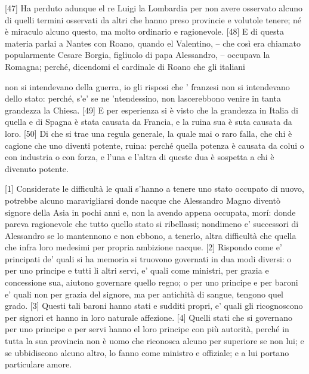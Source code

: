 {[}47{]} Ha perduto adunque el re Luigi la Lombardia per non avere
osservato alcuno di quelli termini osservati da altri che hanno preso
provincie e volutole tenere; né è miraculo alcuno questo, ma molto
ordinario e ragionevole. {[}48{]} E di questa materia parlai a Nantes
con Roano, quando el Valentino, -- che così era chiamato popularmente
Cesare Borgia, figliuolo di papa Alessandro, -- occupava la Romagna;
perché, dicendomi el cardinale di Roano che gli italiani \linebreak

\quebra

\noindent{}non si
intendevano della guerra, io gli risposi che ' franzesi non si
intendevano dello stato: perché, s'e' se ne 'ntendessino, non
lascerebbono venire in tanta grandezza la Chiesa. {[}49{]} E per
esperienza si è visto che la grandezza in Italia di quella e di Spagna è
stata causata da Francia, e la ruina sua è suta causata da loro.
{[}50{]} Di che si trae una regula generale, la quale mai o raro falla,
che chi è cagione che uno diventi potente, ruina: perché quella potenza
è causata da colui o con industria o con forza, e l'una e l'altra di
queste dua è sospetta a chi è divenuto potente.


{[}1{]} Considerate le difficultà le quali s'hanno a tenere uno stato
occupato di nuovo, potrebbe alcuno maravigliarsi donde nacque che
Alessandro Magno diventò signore della Asia in pochi anni e, non la
avendo appena occupata, morí: donde pareva ragionevole che tutto quello
stato si ribellassi; nondimeno e' successori di Alessandro se lo
mantennono e non ebbono, a tenerlo, altra difficultà che quella che
infra loro medesimi per propria ambizione nacque. {[}2{]} Rispondo come
e' principati de' quali si ha memoria si truovono governati in dua modi
diversi: o per uno principe e tutti li altri servi, e' quali come
ministri, per grazia e concessione sua, aiutono governare quello regno;
o per uno principe e per baroni e' quali non per grazia del signore, ma
per antichità di sangue, tengono quel grado. {[}3{]} Questi tali baroni
hanno stati e sudditi propri, e' quali gli ricognoscono per signori et
hanno in loro naturale affezione. {[}4{]} Quelli stati che si governano
per uno principe e per servi hanno el loro principe con più autorità,
perché in tutta la sua provincia non è uomo che riconosca alcuno per
superiore se non lui; e se ubbidiscono alcuno altro, lo fanno come ministro e offiziale; e a lui portano particulare amore.

